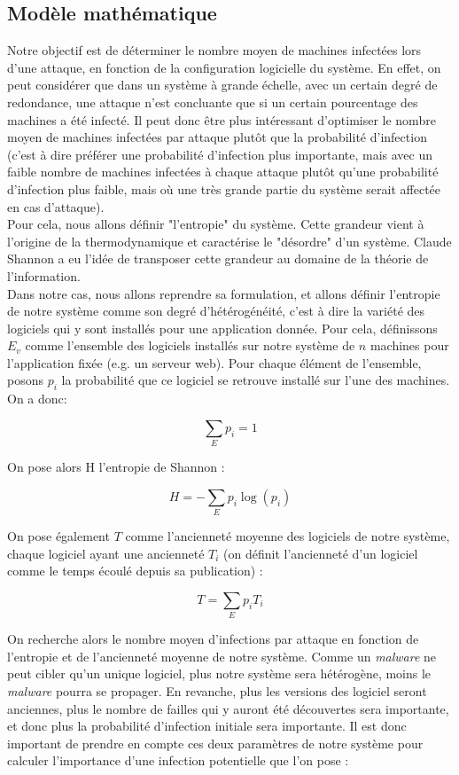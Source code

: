 \subsection{Modèle mathématique}\label{sec:modelMath}

Notre objectif est de déterminer le nombre moyen de machines infectées lors d'une attaque, en fonction de la configuration logicielle du système. En effet, on peut considérer que dans un système à grande échelle, avec un certain degré de redondance, une attaque n'est concluante que si un certain pourcentage des machines a été infecté. Il peut donc être plus intéressant d'optimiser le nombre moyen de machines infectées par attaque plutôt que la probabilité d'infection (c'est à dire préférer une probabilité d'infection plus importante, mais avec un faible nombre de machines infectées à chaque attaque plutôt qu'une probabilité d'infection plus faible, mais où une très grande partie du système serait affectée en cas d'attaque).\\
Pour cela, nous allons définir "l'entropie" du système. Cette grandeur vient à l'origine de la thermodynamique et caractérise le "désordre" d'un système. Claude Shannon a eu l'idée de transposer cette grandeur au domaine de la théorie de l'information\cite{entropie_shannon}.\\
Dans notre cas, nous allons reprendre sa formulation, et allons définir l'entropie de notre système comme son degré d'hétérogénéité, c'est à dire la variété des logiciels qui y sont installés pour une application donnée.
Pour cela, définissons $E_v$ comme l'ensemble des logiciels installés sur notre système de $n$ machines pour l'application fixée (e.g. un serveur web). Pour chaque élément de l'ensemble, posons $p_i$ la probabilité que ce logiciel se retrouve installé sur l'une des machines. 
On a donc:

\[
\sum_{E}p_i=1
\]

On pose alors H l'entropie de Shannon :

\[
H=-\sum_E p_i \log(p_i)
\]

On pose également $T$ comme l'ancienneté moyenne des logiciels de notre système, chaque logiciel ayant une ancienneté $T_i$ (on définit l'ancienneté d'un logiciel comme le temps écoulé depuis sa publication)  :

\[
T=\sum_E p_i T_i
\]

On recherche alors le nombre moyen d'infections par attaque en fonction de l'entropie et de l'ancienneté moyenne de notre système. Comme un \textit{malware} ne peut cibler qu'un unique logiciel, plus notre système sera hétérogène, moins le \textit{malware} pourra se propager. En revanche, plus les versions des logiciel seront anciennes, plus le nombre de failles qui y auront été découvertes sera importante, et donc plus la probabilité d'infection initiale sera importante. Il est donc important de prendre en compte ces deux paramètres de notre système pour calculer l'importance d'une infection potentielle que l'on pose : 

